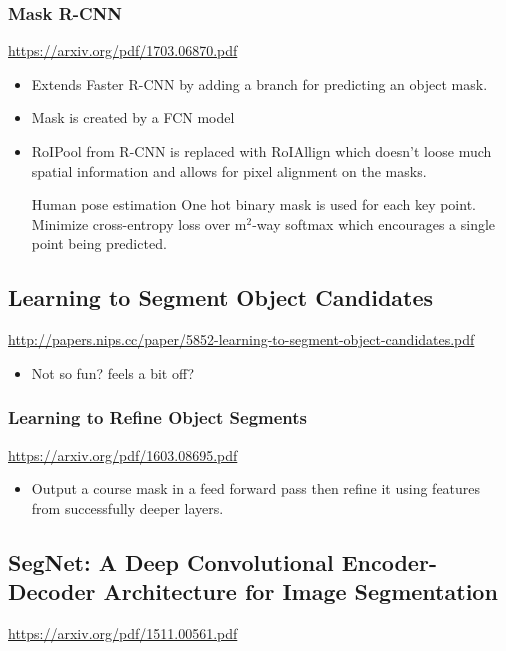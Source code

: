 \documentclass[11pt]{article}
\begin{document}
\subsubsection{Mask R-CNN}
\label{sec:org109ba40}
\url{https://arxiv.org/pdf/1703.06870.pdf}

\begin{itemize}
\item Extends Faster R-CNN by adding a branch for predicting an object mask.
\item Mask is created by a FCN model
\item RoIPool from R-CNN is replaced with RoIAllign which doesn't loose much spatial information and allows for pixel alignment on the masks.
\item[{Human pose estimation}] One hot binary mask is used for each key point. Minimize cross-entropy loss over m\(^{\text{2}}\)-way softmax which encourages a single point being predicted.
\end{itemize}

\subsection{Learning to Segment Object Candidates}
\label{sec:org9f96b8f}
\url{http://papers.nips.cc/paper/5852-learning-to-segment-object-candidates.pdf}
\begin{itemize}
\item Not so fun? feels a bit off?
\end{itemize}

\subsubsection{Learning to Refine Object Segments}
\label{sec:org799383e}
\url{https://arxiv.org/pdf/1603.08695.pdf}
\begin{itemize}
\item Output a course mask in a feed forward pass then refine it using features from successfully deeper layers.
\end{itemize}

\subsection{SegNet: A Deep Convolutional Encoder-Decoder Architecture for Image Segmentation}
\label{sec:org5ac9bbd}
\url{https://arxiv.org/pdf/1511.00561.pdf}
\end{document}
